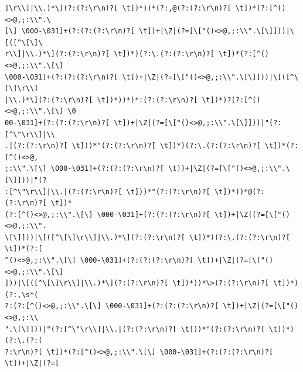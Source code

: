 \documentclass{beamer}
\begin{document}
\begin{frame}[fragile]
\begingroup
 \fontsize{6pt}{8pt}\selectfont
\begin{verbatim}
]\r\\]|\\.)*\](?:(?:\r\n)?[ \t])*))*(?:,@(?:(?:\r\n)?[ \t])*(?:[^()<>@,;:\\".\
[\] \000-\031]+(?:(?:(?:\r\n)?[ \t])+|\Z|(?=[\["()<>@,;:\\".\[\]]))|\[([^\[\]\
r\\]|\\.)*\](?:(?:\r\n)?[ \t])*)(?:\.(?:(?:\r\n)?[ \t])*(?:[^()<>@,;:\\".\[\] 
\000-\031]+(?:(?:(?:\r\n)?[ \t])+|\Z|(?=[\["()<>@,;:\\".\[\]]))|\[([^\[\]\r\\]
|\\.)*\](?:(?:\r\n)?[ \t])*))*)*:(?:(?:\r\n)?[ \t])*)?(?:[^()<>@,;:\\".\[\] \0
00-\031]+(?:(?:(?:\r\n)?[ \t])+|\Z|(?=[\["()<>@,;:\\".\[\]]))|"(?:[^\"\r\\]|\\
.|(?:(?:\r\n)?[ \t]))*"(?:(?:\r\n)?[ \t])*)(?:\.(?:(?:\r\n)?[ \t])*(?:[^()<>@,
;:\\".\[\] \000-\031]+(?:(?:(?:\r\n)?[ \t])+|\Z|(?=[\["()<>@,;:\\".\[\]]))|"(?
:[^\"\r\\]|\\.|(?:(?:\r\n)?[ \t]))*"(?:(?:\r\n)?[ \t])*))*@(?:(?:\r\n)?[ \t])*
(?:[^()<>@,;:\\".\[\] \000-\031]+(?:(?:(?:\r\n)?[ \t])+|\Z|(?=[\["()<>@,;:\\".
\[\]]))|\[([^\[\]\r\\]|\\.)*\](?:(?:\r\n)?[ \t])*)(?:\.(?:(?:\r\n)?[ \t])*(?:[
^()<>@,;:\\".\[\] \000-\031]+(?:(?:(?:\r\n)?[ \t])+|\Z|(?=[\["()<>@,;:\\".\[\]
]))|\[([^\[\]\r\\]|\\.)*\](?:(?:\r\n)?[ \t])*))*\>(?:(?:\r\n)?[ \t])*)(?:,\s*(
?:(?:[^()<>@,;:\\".\[\] \000-\031]+(?:(?:(?:\r\n)?[ \t])+|\Z|(?=[\["()<>@,;:\\
".\[\]]))|"(?:[^\"\r\\]|\\.|(?:(?:\r\n)?[ \t]))*"(?:(?:\r\n)?[ \t])*)(?:\.(?:(
?:\r\n)?[ \t])*(?:[^()<>@,;:\\".\[\] \000-\031]+(?:(?:(?:\r\n)?[ \t])+|\Z|(?=[

\end{verbatim}
\end{frame}
\end{document}
